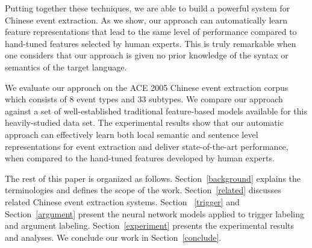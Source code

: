 Putting together these techniques, we are able to build a powerful
system for Chinese event extraction. As we show, our approach can
automatically learn feature representations that lead to the same level of performance compared to hand-tuned features selected by %
human experts. This is truly remarkable when one considers that our approach is given no prior knowledge of
the syntax or semantics of the target language. %

We evaluate our approach on the ACE 2005 Chinese event extraction corpus which consists of 8 event types and 33 subtypes.
We compare our approach against a set of well-established traditional feature-based models available for this heavily-studied data set. 
The experimental results show that our automatic approach can effectively learn both local semantic and sentence level
representations for event extraction and deliver state-of-the-art performance, when compared to 
the hand-tuned features developed by human experts. 


The rest of this paper is organized as follows. Section~\ref{background} explains the terminologies and defines the
scope of the work. Section~\ref{related} discusses related Chinese event extraction systems. Section ~\ref{trigger} and
Section~\ref{argument} present the neural network models applied to trigger labeling and argument labeling.
Section~\ref{experiment} presents the experimental results and analyses. We conclude our work in
Section~\ref{conclude}.
